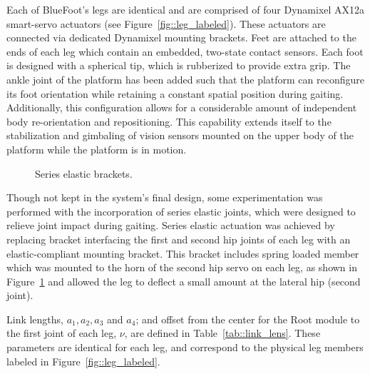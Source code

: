 			Each of BlueFoot's legs are identical and are comprised of four Dynamixel AX12a smart-servo actuators (see Figure~\ref{fig::leg_labeled}). These actuators are connected via dedicated Dynamixel mounting brackets. Feet are attached to the ends of each leg which contain an embedded, two-state contact sensors. Each foot is designed with a spherical tip, which is rubberized to provide extra grip. The ankle joint of the platform has been added such that the platform can reconfigure its foot orientation while retaining a constant spatial position during gaiting. Additionally, this configuration allows for a considerable amount of independent body re-orientation and repositioning. This capability extends itself to the stabilization and gimbaling of vision sensors mounted on the upper body of the platform while the platform is in motion.
		
			\begin{figure}[h!]
				\centering
				\caption{Series elastic brackets.}
				\label{fig::sea_bracket}
			\end{figure}

			Though not kept in the system's final design, some experimentation was performed with the incorporation of series elastic joints, which were designed to relieve joint impact during gaiting. Series elastic actuation was achieved by replacing bracket interfacing the first and second hip joints of each leg with an elastic-compliant mounting bracket. This bracket includes spring loaded member which was mounted to the horn of the second hip servo on each leg, as shown in Figure~\ref{fig::sea_bracket} and allowed the leg to deflect a small amount at the lateral hip (second joint).

			Link lengths, $a_{1}, a_{2}, a_{3}$ and $a_{4}$; and offset from the center for the Root module to the first joint of each leg, $\nu$, are defined in Table~\ref{tab::link_lens}. These parameters are identical for each leg, and correspond to the physical leg members labeled in Figure~\ref{fig::leg_labeled}.

